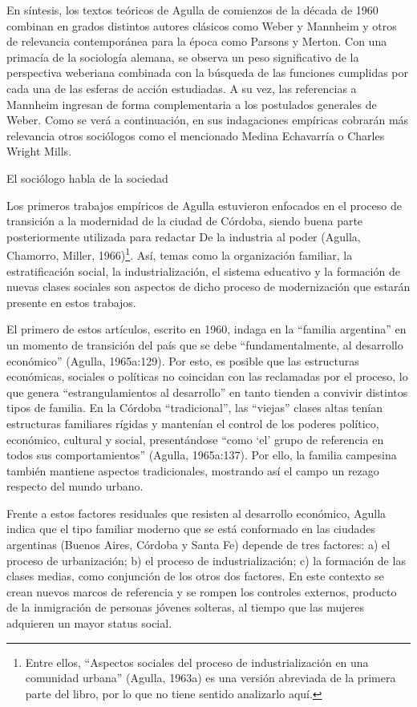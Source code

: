 En síntesis, los textos teóricos de Agulla de comienzos de la década de 1960 combinan en grados distintos autores clásicos como Weber y Mannheim y otros de relevancia contemporánea para la época como Parsons y Merton. Con una primacía de la sociología alemana, se observa un peso significativo de la perspectiva weberiana combinada con la búsqueda de las funciones cumplidas por cada una de las esferas de acción estudiadas. A su vez, las referencias a Mannheim ingresan de forma complementaria a los postulados generales de Weber. Como se verá a continuación, en sus indagaciones empíricas cobrarán más relevancia otros sociólogos como el mencionado Medina Echavarría o Charles Wright Mills.

El sociólogo habla de la sociedad

Los primeros trabajos empíricos de Agulla estuvieron enfocados en el proceso de transición a la modernidad de la ciudad de Córdoba, siendo buena parte posteriormente utilizada para redactar De la industria al poder (Agulla, Chamorro, Miller, 1966)\footnote{Entre ellos, ``Aspectos sociales del proceso de industrialización en una comunidad urbana'' (Agulla, 1963a) es una versión abreviada de la primera parte del libro, por lo que no tiene sentido analizarlo aquí.}. Así, temas como la organización familiar, la estratificación social, la industrialización, el sistema educativo y la formación de nuevas clases sociales son aspectos de dicho proceso de modernización que estarán presente en estos trabajos.

El primero de estos artículos, escrito en 1960, indaga en la ``familia argentina'' en un momento de transición del país que se debe ``fundamentalmente, al desarrollo económico'' (Agulla, 1965a:129). Por esto, es posible que las estructuras económicas, sociales o políticas no coincidan con las reclamadas por el proceso, lo que genera ``estrangulamientos al desarrollo'' en tanto tienden a convivir distintos tipos de familia. En la Córdoba ``tradicional'', las ``viejas'' clases altas tenían estructuras familiares rígidas y mantenían el control de los poderes político, económico, cultural y social, presentándose ``como `el' grupo de referencia en todos sus comportamientos'' (Agulla, 1965a:137). Por ello, la familia campesina también mantiene aspectos tradicionales, mostrando así el campo un rezago respecto del mundo urbano.

Frente a estos factores residuales que resisten al desarrollo económico, Agulla indica que el tipo familiar moderno que se está conformado en las ciudades argentinas (Buenos Aires, Córdoba y Santa Fe) depende de tres factores: a) el proceso de urbanización; b) el proceso de industrialización; c) la formación de las clases medias, como conjunción de los otros dos factores. En este contexto se crean nuevos marcos de referencia y se rompen los controles externos, producto de la inmigración de personas jóvenes solteras, al tiempo que las mujeres adquieren un mayor status social.

